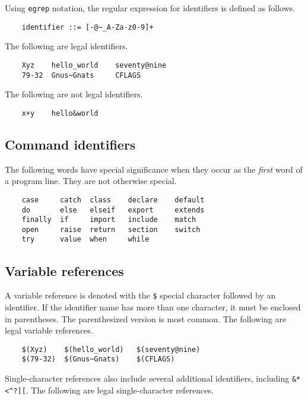 Using \verb+egrep+ notation, the regular expression for identifiers is defined as follows.

\begin{verbatim}
    identifier ::= [-@~_A-Za-z0-9]+
\end{verbatim}

The following are legal identifiers.

\begin{verbatim}
    Xyz    hello_world    seventy@nine
    79-32  Gnus~Gnats     CFLAGS
\end{verbatim}

The following are not legal identifiers.

\begin{verbatim}
    x+y    hello&world
\end{verbatim}

\subsection{Command identifiers}

The following words have special significance when they occur as the \emph{first} word
of a program line.  They are not otherwise special.

\begin{verbatim}
    case     catch  class    declare    default
    do       else   elseif   export     extends
    finally  if     import   include    match
    open     raise  return   section    switch
    try      value  when     while
\end{verbatim}

\subsection{Variable references}

A variable reference is denoted with the \verb+$+ special character followed by an identifier.  If
the identifier name has more than one character, it must be enclosed in parentheses.  The
parenthesized version is most common.  The following are legal variable references.

\begin{verbatim}
    $(Xyz)    $(hello_world)   $(seventy@nine)
    $(79-32)  $(Gnus~Gnats)    $(CFLAGS)
\end{verbatim}

Single-character references also include several additional identifiers, including \verb+&*<^?][+.
The following are legal single-character references.

